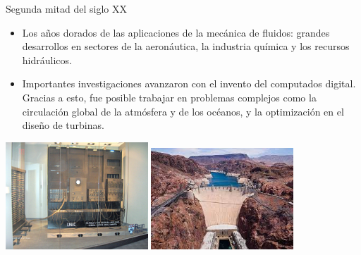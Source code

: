 \documentclass [xcolor=svgnames, t] {beamer}
\begin{document}
\begin{frame}{Segunda mitad del siglo XX}
\vspace{-0.4cm}
\begin{exampleblock}{}
\begin{itemize}
\item Los a\~nos dorados de las aplicaciones de la mecánica de fluidos: grandes desarrollos en sectores de la aeronáutica, la industria química y los recursos hidráulicos.
\item Importantes investigaciones avanzaron con el invento del computados digital. Gracias a esto, fue posible trabajar en problemas complejos como la circulación global de la atmósfera y de los océanos, y la optimización en el diseño de turbinas.
\end{itemize}
\end{exampleblock}
\begin{center}
\includegraphics[width=0.4\textwidth]{compu}
\includegraphics[width=0.4\textwidth]{hoov}
\end{center}
\end{frame}
\end{document}
